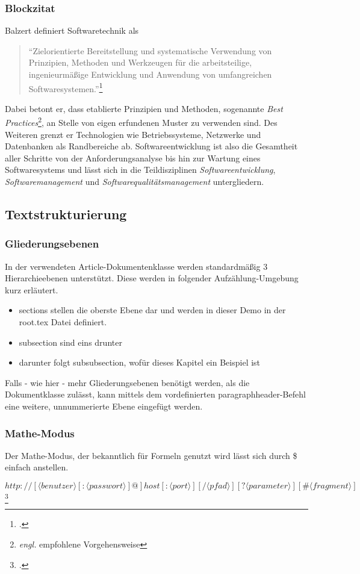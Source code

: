   \subsubsection{Blockzitat}
    Balzert definiert Softwaretechnik als
    \begin{quotation}
      "`Zielorientierte Bereitstellung und systematische Verwendung von Prinzipien, Methoden und Werkzeugen 
      für die arbeitsteilige, ingenieurmäßige Entwicklung und Anwendung von umfangreichen Softwaresystemen."'\footcite[S. 17]{balzert2010lehrbuch}    
    \end{quotation}
    Dabei betont er, dass etablierte Prinzipien und Methoden, sogenannte 
    \emph{Best Practices}\footnote{\emph{engl.} empfohlene Vorgehensweise},
    an Stelle von eigen erfundenen Muster zu verwenden sind.
    Des Weiteren grenzt er Technologien wie Betriebssysteme, Netzwerke und Datenbanken als Randbereiche ab. 
    Softwareentwicklung ist also die Gesamtheit aller Schritte von der Anforderungsanalyse bis hin zur Wartung eines Softwaresystems
    und lässt sich in die Teildisziplinen \emph{Softwareentwicklung}, \emph{Softwaremanagement} und \emph{Softwarequalitätsmanagement} untergliedern.

\subsection{Textstrukturierung}
  \subsubsection{Gliederungsebenen}
    In der verwendeten Article-Dokumentenklasse werden standardmäßig 3 Hierarchieebenen unterstützt.
    Diese werden in folgender Aufzählung-Umgebung kurz erläutert.
    
    \begin{itemize}
      \item sections stellen die oberste Ebene dar und werden in dieser Demo in der root.tex Datei definiert.
      \item subsection sind eins drunter
      \item darunter folgt subsubsection, wofür dieses Kapitel ein Beispiel ist 
    \end{itemize}

    Falls - wie hier - mehr Gliederungsebenen benötigt werden, als die Dokumentklasse zulässt, 
    kann mittels dem vordefinierten paragraphheader-Befehl eine weitere, unnummerierte Ebene eingefügt werden.
   
  \subsubsection{Mathe-Modus}
    Der Mathe-Modus, der bekanntlich für Formeln genutzt wird lässt sich durch \$ einfach anstellen.

    $http{:}//[\langle benutzer\rangle[{:}\langle passwort\rangle]@]host[{:}\langle port\rangle][/\langle pfad\rangle][?\langle parameter\rangle][\#\langle fragment\rangle]$
    \footcite[Für den Standard URL siehe][]{WHATWGURL}
